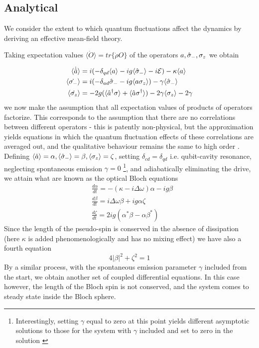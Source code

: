 \subsection{Analytical}

We consider the extent to which quantum fluctuations affect the dynamics by deriving an effective mean-field theory.

Taking expectation values $\langle \dot{O} \rangle = tr\{\dot{\rho} O \}$ of the operators $a, \hat{\sigma}_-, \sigma_z$ we obtain

\begin{align}
  \langle \dot{\hat{a}} \rangle & = i(-\delta_{qd}\langle a \rangle - ig \langle \hat{\sigma}_- \rangle -i\mathcal{E}) -\kappa \langle a \rangle \\
  \langle \dot{\sigma_-} \rangle & = i(-\delta_{ad}\hat{\sigma}_- - ig \langle a \sigma_z \rangle) - \gamma \langle \hat{\sigma}_- \rangle \\
  \langle \dot{\sigma_z} \rangle & = -2g ( \langle \hat{a}^\dagger \sigma \rangle + \langle \hat{a} \sigma^\dagger \rangle) - 2 \gamma \langle \sigma_z \rangle - 2 \gamma
\end{align}
we now make the assumption that all expectation values of products of operators factorize. This corresponds to the assumption that there are no correlations between different operators - this is patently non-physical, but the approximation yields equations in which the quantum fluctuation effects of these correlations are averaged out, and the qualitative behaviour remains the same to high order \cite{Jaynes1963a}. Defining $\langle \hat{a} \rangle = \alpha, \langle \hat{\sigma}_- \rangle = \beta, \langle \sigma_z \rangle = \zeta$, setting $\delta_{cd} = \delta_{qd}$ i.e. qubit-cavity resonance, neglecting spontaneous emission $\gamma=0$ \footnote{ Interestingly, setting $\gamma$ equal to zero at this point yields different asymptotic solutions to those for the system with $\gamma$ included and set to zero in the solution \cite{Carmichael2015}}, and adiabatically eliminating the drive, we attain what are known as the optical Bloch equations
\begin{align}
  &\frac{d \alpha}{dt} = -(\kappa -i \Delta \omega) \alpha-ig \beta \label{eq:alpha}\\
  &\frac{d \beta}{dt} = i \Delta \omega \beta +ig \alpha \zeta \label{eq:beta}\\
  &\frac{d \zeta}{dt} = 2 i g(\alpha^* \beta -\alpha \beta^*)\label{eq:zeta}
\end{align}
Since the length of the pseudo-spin is conserved in the absence of dissipation (here $\kappa$ is added phenomenologically and has no mixing effect) we have also a fourth equation
\begin{equation}
  4|\beta|^2+\zeta^2 = 1 \label{eq:pseudospin}
\end{equation}
By a similar process, with the spontaneous emission parameter $\gamma$ included from the start, we obtain another set of coupled differential equations. In this case however, the length of the Bloch spin is not conserved, and the system comes to steady state inside the Bloch sphere.
